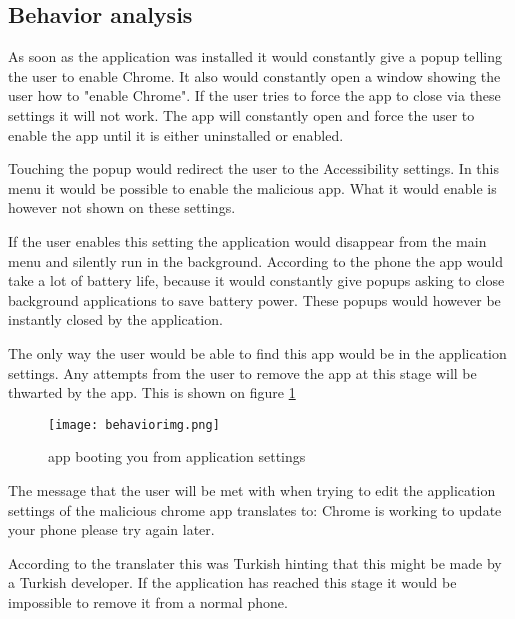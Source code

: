 \subsection{Behavior analysis}

As soon as the application was installed it would constantly give a popup telling the user to enable Chrome. 
It also would constantly open a window showing the user how to "enable Chrome". 
If the user tries to force the app to close via these settings it will not work. 
The app will constantly open and force the user to enable the app until it is either uninstalled or enabled.
 
Touching the popup would redirect the user to the Accessibility settings. 
In this menu it would be possible to enable the malicious app. 
What it would enable is however not shown on these settings.

If the user enables this setting the application would disappear from the main menu and silently run in the background. 
According to the phone the app would take a lot of battery life, because it would constantly give popups asking to close background applications to save battery power. 
These popups would however be instantly closed by the application.

The only way the user would be able to find this app would be in the application settings. 
Any attempts from the user to remove the app at this stage will be thwarted by the app.
This is shown on figure \ref{tim-appbehavior}

\begin{figure}[H]
    \centering
    \texttt{[image: behaviorimg.png]}
    \caption{app booting you from application settings}
    \label{tim-appbehavior}
\end{figure}

The message that the user will be met with when trying to edit the application settings of the malicious chrome app translates to: 
Chrome is working to update your phone please try again later.

According to the translater this was Turkish hinting that this might be made by a Turkish developer.
If the application has reached this stage it would be impossible to remove it from a normal phone.
